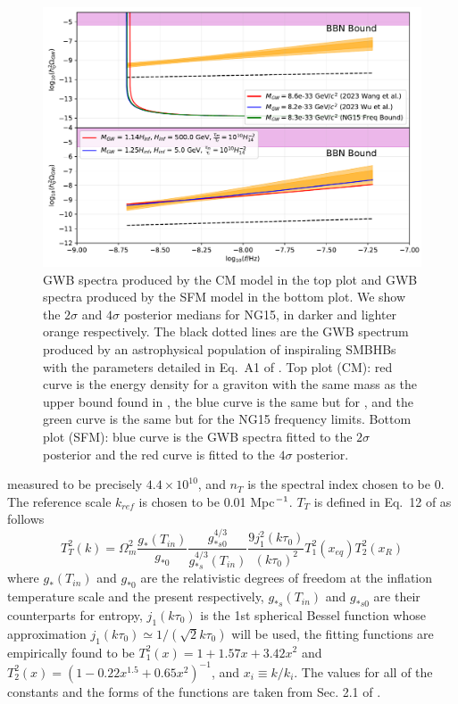 \documentclass[prd,twocolumn,aps,psfig,nofootinbib,nobibnotes,superscriptaddress,preprintnumbers,times]{revtex4-2}
\begin{document}
\begin{center}
\begin{figure}
\includegraphics[width=\textwidth]{fig/fig8.pdf} 
\caption{GWB spectra produced by the CM model \cite{Gumrukcuoglu:2012} in the top plot and GWB spectra produced by the SFM model \cite{Fujita:2018} in the bottom plot. We show the $2\sigma$ and $4\sigma$ posterior medians for NG15, in darker and lighter orange respectively. The black dotted lines are the GWB spectrum produced by an astrophysical population of inspiraling SMBHBs with the parameters detailed in Eq.\ A1 of \cite{Afzal:2023}. Top plot (CM): red curve is the energy density for a graviton with the same mass as the upper bound found in \cite{Wang:2023}, the blue curve is the same but for \cite{Wu:2023}, and the green curve is the same but for the NG15 frequency limits. Bottom plot (SFM): blue curve is the GWB spectra fitted to the $2\sigma$ posterior and the red curve is fitted to the $4\sigma$ posterior.}
\label{fig:GWB}
\end{figure}
\end{center}
\twocolumngrid 
\hspace{-1em}measured to be precisely $4.4\times 10^{10}$, and $n_T$ is the spectral index chosen to be 0. The reference scale $k_{ref}$ is chosen to be 0.01 Mpc$\/^{-1}$. $T_{T}$ is defined in Eq.\ 12 of \cite{Kuroyanagi:2015} as follows 
\begin{equation}\label{eqn:24}
    T_T^2(k) = \Omega_m^2 \frac{g_*(T_{in})}{g_{*0}} \frac{g_{*s0}^{4/3}}{g_{*s}^{4/3}(T_{in})} \frac{9j_1^2(k\tau_0)}{(k\tau_0)^2}T_1^2(x_{eq}) T_2^2(x_R)
\end{equation}
where $g_{*}(T_{in})$ and $g_{*0}$ are the relativistic degrees of freedom at the inflation temperature scale and the present respectively, $g_{*s}(T_{in})$ and $g_{*s0}$ are their counterparts for entropy, $j_1(k\tau_0)$ is the 1st spherical Bessel function whose approximation $j_1(k\tau_0) \simeq 1/(\sqrt{2}k\tau_0)$ will be used, the fitting functions are empirically found to be $T_1^2(x) = 1+1.57x+3.42x^2$ and $T_2^2(x) = (1-0.22x^{1.5} + 0.65x^2)^{-1}$, and $x_i \equiv k/k_i$. The values for all of the constants and the forms of the functions are taken from Sec. 2.1 of \cite{Kuroyanagi:2015}. 
\end{document}
